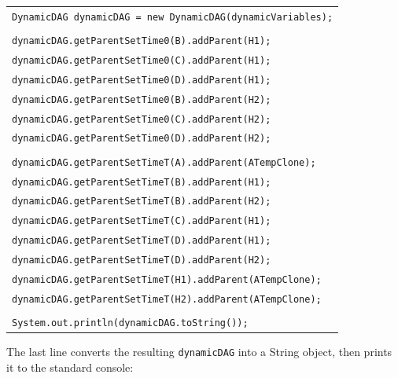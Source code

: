 \vspace{-0.1in}
\begin{table}[H]
\begin{tabular}{l} \\ \hline

        \texttt{DynamicDAG dynamicDAG = new DynamicDAG(dynamicVariables);}\\\\

        \texttt{dynamicDAG.getParentSetTime0(B).addParent(H1);}\\
        \texttt{dynamicDAG.getParentSetTime0(C).addParent(H1);}\\
        \texttt{dynamicDAG.getParentSetTime0(D).addParent(H1);}\\
        \texttt{dynamicDAG.getParentSetTime0(B).addParent(H2);}\\
        \texttt{dynamicDAG.getParentSetTime0(C).addParent(H2);}\\
        \texttt{dynamicDAG.getParentSetTime0(D).addParent(H2);}\\\\

        \texttt{dynamicDAG.getParentSetTimeT(A).addParent(ATempClone);}\\
        \texttt{dynamicDAG.getParentSetTimeT(B).addParent(H1);}\\
        \texttt{dynamicDAG.getParentSetTimeT(B).addParent(H2);}\\
        \texttt{dynamicDAG.getParentSetTimeT(C).addParent(H1);}\\
        \texttt{dynamicDAG.getParentSetTimeT(D).addParent(H1);}\\
        \texttt{dynamicDAG.getParentSetTimeT(D).addParent(H2);}\\
        \texttt{dynamicDAG.getParentSetTimeT(H1).addParent(ATempClone);}\\
        \texttt{dynamicDAG.getParentSetTimeT(H2).addParent(ATempClone);}\\\\
        
        \texttt{System.out.println(dynamicDAG.toString());}\\\hline 

\end{tabular}
\end{table}

The last line converts the resulting \texttt{dynamicDAG} into a String object, then prints it to the standard console:

